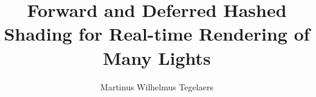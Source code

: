 \documentclass[sigconf]{acmart}
\title{Forward and Deferred Hashed Shading for Real-time Rendering of Many Lights}
\author{Martinus Wilhelmus Tegelaers}
\affiliation{\institution{KULeuven}}
\begin{document}



\maketitle


  








\appendix
\onecolumn

\end{document}
